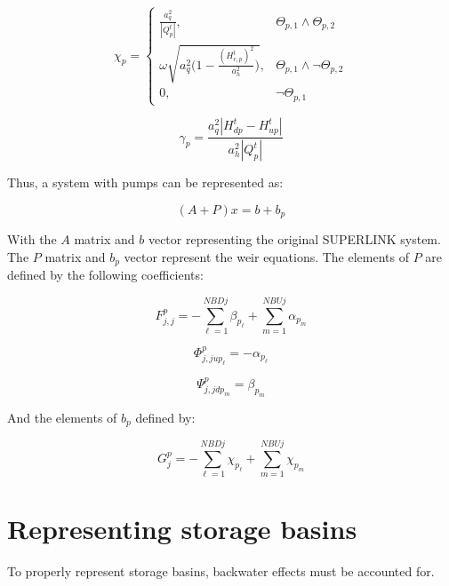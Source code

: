 \documentclass[11pt]{article}
\begin{document}
\begin{equation}
  \boxed{
  \chi_{p} =
  \begin{cases}
   \frac{a_q^2}{|Q_p^t|}, & \Theta_{p,1} \land \Theta_{p,2}\\
   \omega \sqrt{a_q^2 \bigl( 1 - \frac{( H_{e,p}^t)^2}{a_h^2} \bigr)}, & \Theta_{p,1} \land \lnot \Theta_{p,2}\\
   0, & \lnot \Theta_{p,1}
  \end{cases}
  }
\end{equation}

\begin{equation}
  \boxed{
 \gamma_p = \frac{a_q^2 |H_{dp}^t - H_{up}^t|}{a_h^2 |Q_{p}^t|}
 }
\end{equation}

Thus, a system with pumps can be represented as:

\begin{equation}
  (A + P) x = b + b_p
\end{equation}

With the $A$ matrix and $b$ vector representing the original SUPERLINK system.
The $P$ matrix and $b_p$ vector represent the weir equations. The elements of
$P$ are defined by the following coefficients:

\begin{equation}
  \boxed{
  F_{j,j}^p = - \sum_{\ell=1}^{NBDj} \beta_{p_\ell} + \sum_{m=1}^{NBUj} \alpha_{p_m}
  }
\end{equation}

\begin{equation}
  \boxed{
  \Phi_{j,jup_\ell}^p = - \alpha_{p_\ell}
  }
\end{equation}

\begin{equation}
  \boxed{
  \Psi_{j,jdp_m}^p = \beta_{p_m}
  }
\end{equation}

And the elements of $b_p$ defined by:

\begin{equation}
  \boxed{
  G_j^p = - \sum_{\ell=1}^{NBDj} \chi_{p_\ell} + \sum_{m=1}^{NBUj} \chi_{p_m}
  }
\end{equation}

\section{Representing storage basins}

To properly represent storage basins, backwater effects must be accounted for.
\end{document}
